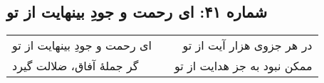 \begin{center}
\section*{شماره ۴۱: ای رحمت و جودِ بینهایت از تو}
\label{sec:041}
\begin{longtable}{l p{0.5cm} r}
ای رحمت و جودِ بینهایت از تو
&&
در هر جزوی هزار آیت از تو
\\
گر جملهٔ آفاق، ضلالت گیرد
&&
ممکن نبود به جز هدایت از تو
\\
\end{longtable}
\end{center}
